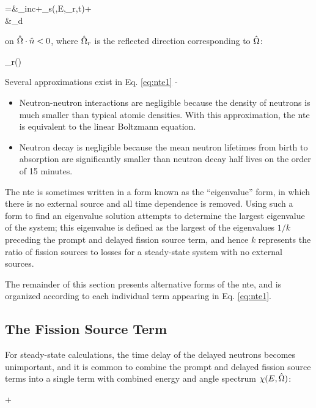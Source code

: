 \beqa
\psi\seat=&\psi_{inc}\seat+\alpha_s\seat\psi(,E,\hO_r,t)+\\
&\hspace{1cm}\alpha_d\seat{}
\eeqa

on \(\hat{\Omega}\cdot\hat{n}<0\), where \(\hat{\Omega}_r\) is the reflected direction corresponding to \(\hat{\Omega}\):

\beq
\label{eq:hOrDef}
\hO_r\equiv{}\left(\hO\cdot{}\right)
\eeq

Several approximations exist in Eq. \eqref{eq:nte1} -

\begin{itemize}
\item Neutron-neutron interactions are negligible because the density of neutrons is much smaller than typical atomic densities. With this approximation, the \gls{nte} is equivalent to the linear Boltzmann equation.
\item Neutron decay is negligible because the mean neutron lifetimes from birth to absorption are significantly smaller than neutron decay half lives on the order of 15 minutes.
\end{itemize}

The \gls{nte} is sometimes written in a form known as the ``eigenvalue'' form, in which there is no external source and all time dependence is removed. Using such a form to find an eigenvalue solution attempts to determine the largest eigenvalue of the system; this eigenvalue is defined as the largest of the eigenvalues \(1/k\) preceding the prompt and delayed fission source term, and hence \(k\) represents the ratio of fission sources to losses for a steady-state system with no external sources.

The remainder of this section presents alternative forms of the \gls{nte}, and is organized according to each individual term appearing in Eq. \eqref{eq:nte1}.

\subsection{The Fission Source Term}

For steady-state calculations, the time delay of the delayed neutrons becomes unimportant, and it is common to combine the prompt and delayed fission source terms into a single term with combined energy and angle spectrum \(\chi(E,\hat{\Omega})\):

\beqa
\promptfissionsource\psi\seatprime+\delayedfissionsource\rightarrow\\
\totalfissionsource\psi\seatprime
\eeqa

